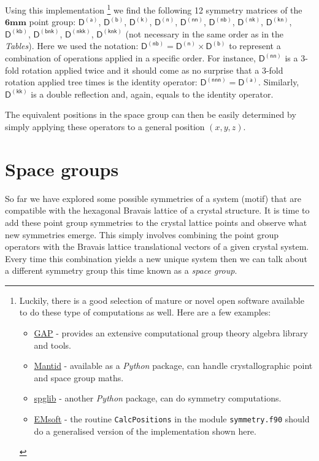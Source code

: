 Using this implementation%
\footnote{ Luckily, there is a good selection of mature or novel open software available to do these type of computations as well. Here are a few examples:
\begin{itemize}
\item \href{www.gap-system.org}{GAP} - provides an extensive computational group theory algebra library and tools.
\item \href{http://docs.mantidproject.org/v3.7.1/concepts/PointAndSpaceGroups.html}{Mantid} - available as a \textit{Python} package, can handle crystallographic point and space group maths.
\item \href{https://atztogo.github.io/spglib/python-spglib.html}{spglib} - another \textit{Python} package, can do symmetry computations. 
\item \href{https://github.com/marcdegraef/EMsoft}{EMsoft} - the routine \texttt{CalcPositions} in the module \texttt{symmetry.f90} should do a generalised version of the implementation shown here.
\end{itemize}
}
 we find the following 12 symmetry matrices of the $\mathbf{6mm}$ point group: $\mathsf{D^{(a)}}$, $\mathsf{D^{(b)}}$, $\mathsf{D^{(k)}}$, $\mathsf{D^{(n)}}$, $\mathsf{D^{(nn)}}$, $\mathsf{D^{(nb)}}$, $\mathsf{D^{(nk)}}$, $\mathsf{D^{(kn)}}$, $\mathsf{D^{(kb)}}$,  $\mathsf{D^{(bnk)}}$, $\mathsf{D^{(nkk)}}$, $\mathsf{D^{(knk)}}$ (not necessary in the same order as in the \textit{Tables}). Here we used the notation: $\mathsf{D^{(nb)}} = \mathsf{D^{(n)}} \times \mathsf{D^{(b)}}$ to represent a combination of operations applied in a specific order. For instance, $\mathsf{D^{(nn)}}$ is a 3-fold rotation applied twice and it should come as no surprise that a 3-fold rotation applied tree times is the identity operator: $\mathsf{D^{(nnn)}} = \mathsf{D^{(a)}}$. Similarly, $\mathsf{D^{(kk)}}$ is a double reflection and, again, equals to the identity operator.

The equivalent positions in the space group can then be easily determined by simply applying these operators to a general position $(x, y, z)$.



\section{Space groups }

So far we have explored some possible symmetries of a system (motif) that are compatible with the hexagonal Bravais lattice of a crystal structure. It is time to add these point group symmetries to the crystal lattice points and observe what new symmetries emerge. This simply involves combining the point group operators with the Bravais lattice translational vectors of a given crystal system. Every time this combination yields a new unique system then we can talk about a different symmetry group this time known as a \textit{space group}. 

